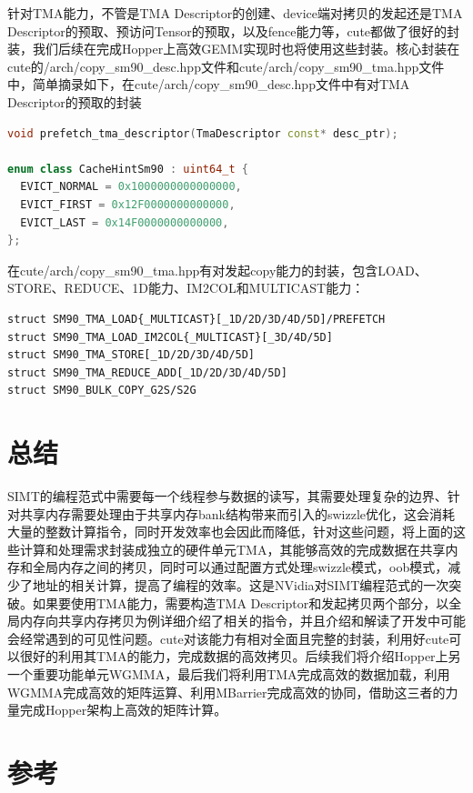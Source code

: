 针对TMA能力，不管是TMA Descriptor的创建、device端对拷贝的发起还是TMA Descriptor的预取、预访问Tensor的预取，以及fence能力等，cute都做了很好的封装，我们后续在完成Hopper上高效GEMM实现时也将使用这些封装。核心封装在cute的/arch/copy\_sm90\_desc.hpp文件和cute/arch/copy\_sm90\_tma.hpp文件中，简单摘录如下，在cute/arch/copy\_sm90\_desc.hpp文件中有对TMA Descriptor的预取的封装

\begin{lstlisting}[language=C++]
void prefetch_tma_descriptor(TmaDescriptor const* desc_ptr);

enum class CacheHintSm90 : uint64_t {
  EVICT_NORMAL = 0x1000000000000000,
  EVICT_FIRST = 0x12F0000000000000,
  EVICT_LAST = 0x14F0000000000000,
};
\end{lstlisting}

在cute/arch/copy\_sm90\_tma.hpp有对发起copy能力的封装，包含LOAD、STORE、REDUCE、1D能力、IM2COL和MULTICAST能力：

\begin{lstlisting}
struct SM90_TMA_LOAD{_MULTICAST}[_1D/2D/3D/4D/5D]/PREFETCH
struct SM90_TMA_LOAD_IM2COL{_MULTICAST}[_3D/4D/5D]
struct SM90_TMA_STORE[_1D/2D/3D/4D/5D]
struct SM90_TMA_REDUCE_ADD[_1D/2D/3D/4D/5D]
struct SM90_BULK_COPY_G2S/S2G
\end{lstlisting}

\section{总结}

SIMT的编程范式中需要每一个线程参与数据的读写，其需要处理复杂的边界、针对共享内存需要处理由于共享内存bank结构带来而引入的swizzle优化，这会消耗大量的整数计算指令，同时开发效率也会因此而降低，针对这些问题，将上面的这些计算和处理需求封装成独立的硬件单元TMA，其能够高效的完成数据在共享内存和全局内存之间的拷贝，同时可以通过配置方式处理swizzle模式，oob模式，减少了地址的相关计算，提高了编程的效率。这是NVidia对SIMT编程范式的一次突破。如果要使用TMA能力，需要构造TMA Descriptor和发起拷贝两个部分，以全局内存向共享内存拷贝为例详细介绍了相关的指令，并且介绍和解读了开发中可能会经常遇到的可见性问题。cute对该能力有相对全面且完整的封装，利用好cute可以很好的利用其TMA的能力，完成数据的高效拷贝。后续我们将介绍Hopper上另一个重要功能单元WGMMA，最后我们将利用TMA完成高效的数据加载，利用WGMMA完成高效的矩阵运算、利用MBarrier完成高效的协同，借助这三者的力量完成Hopper架构上高效的矩阵计算。

\section{参考}

